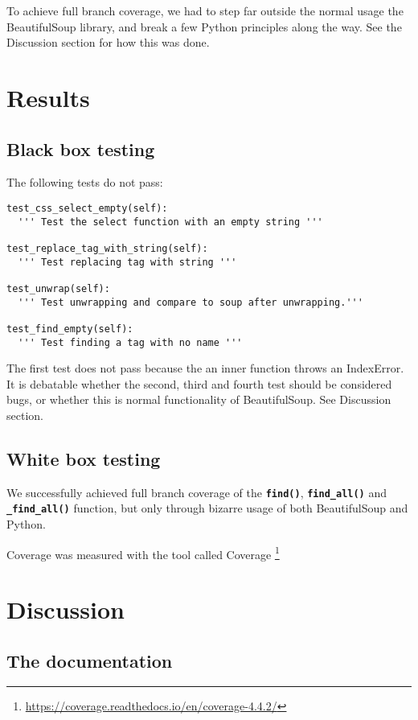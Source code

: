 \documentclass[10pt]{article}
\newcommand{\tbt}[1]{\texttt{\textbf{#1}}}
\begin{document}
To achieve full branch coverage, we had to step far outside the normal usage the BeautifulSoup library, and break a few Python principles along the way. See the Discussion section for how this was done.

\section{Results}

\subsection{Black box testing}

The following tests do not pass:

\begin{lstlisting}[style = pythonstyle]
test_css_select_empty(self):
  ''' Test the select function with an empty string '''

test_replace_tag_with_string(self):
  ''' Test replacing tag with string '''

test_unwrap(self):
  ''' Test unwrapping and compare to soup after unwrapping.'''

test_find_empty(self):
  ''' Test finding a tag with no name '''
\end{lstlisting}

The first test does not pass because the an inner function throws an IndexError. \\
It is debatable whether the second, third and fourth test should be considered bugs, or whether this is normal functionality of BeautifulSoup. See Discussion section.

\subsection{White box testing}

We successfully achieved full branch coverage of the \tbt{find()}, \tbt{find\_all()} and \tbt{\_find\_all()} function, but only through bizarre usage of both BeautifulSoup and Python. 

Coverage was measured with the tool called Coverage \footnote{\url{https://coverage.readthedocs.io/en/coverage-4.4.2/}}

\section{Discussion}

\subsection{The documentation}
\end{document}
